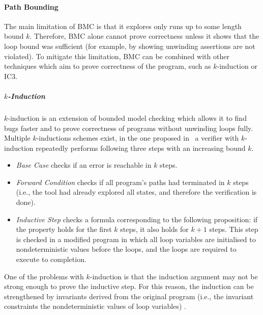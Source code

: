 \paragraph{Path Bounding}

The main limitation of BMC is that it explores only runs up to some length
bound $k$.
Therefore, BMC alone cannot prove correctness unless it shows that the loop
bound was sufficient (for example, by showing unwinding assertions are not
violated).
To mitigate this limitation, BMC can be combined with other techniques which
aim to prove correctness of the program, such as $k$-induction or
IC3.

\subparagraph{$k$-Induction}

$k$-induction  is an extension of
bounded model checking which allows it to find bugs faster and to prove
correctness of programs without unwinding loops fully.
Multiple $k$-inductions schemes exist, in the one proposed in~ a verifier with $k$-induction repeatedly performs following three steps with an increasing bound $k$.

\begin{itemize}
    \item \emph{Base Case} checks if an error is reachable in $k$ steps.
    \item \emph{Forward Condition} checks if all program's paths had terminated in
        $k$ steps (i.e., the tool had already explored all states, and therefore
        the verification is done).
    \item \emph{Inductive Step} checks a formula corresponding to the following
        proposition: if the property holds for the first $k$ steps, it also
        holds for $k+1$ steps.
        This step is checked in a modified program in which all loop variables
        are initialised to nondeterministic values before the loops, and the
        loops are required to execute to completion.
\end{itemize}

One of the problems with $k$-induction is that the induction argument may not be strong enough to prove the inductive step.
For this reason, the induction can be strengthened by invariants derived from the original program (i.e., the invariant constraints the nondeterministic values of loop variables) .


